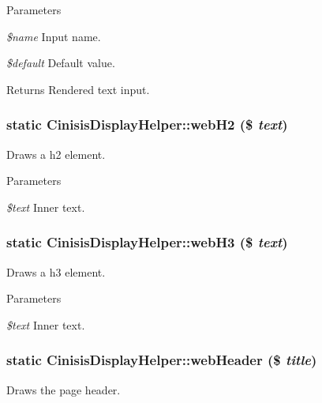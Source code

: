 \begin{DoxyParams}{Parameters}
\item[{\em \$name}]Input name.\item[{\em \$default}]Default value.\end{DoxyParams}
\begin{DoxyReturn}{Returns}
Rendered text input. 
\end{DoxyReturn}
\hypertarget{classCinisisDisplayHelper_a0f2e5c78f6fdd146df04382e497cfe94}{
\subsubsection[{webH2}]{\setlength{\rightskip}{0pt plus 5cm}static CinisisDisplayHelper::webH2 (\$ {\em text})}}
\label{classCinisisDisplayHelper_a0f2e5c78f6fdd146df04382e497cfe94}
Draws a h2 element.


\begin{DoxyParams}{Parameters}
\item[{\em \$text}]Inner text. \end{DoxyParams}
\hypertarget{classCinisisDisplayHelper_acc20c726a214895584d15a434b2f3548}{
\subsubsection[{webH3}]{\setlength{\rightskip}{0pt plus 5cm}static CinisisDisplayHelper::webH3 (\$ {\em text})}}
\label{classCinisisDisplayHelper_acc20c726a214895584d15a434b2f3548}
Draws a h3 element.


\begin{DoxyParams}{Parameters}
\item[{\em \$text}]Inner text. \end{DoxyParams}
\hypertarget{classCinisisDisplayHelper_a356d8117dfcb220b7bb9996b569f5f25}{
\subsubsection[{webHeader}]{\setlength{\rightskip}{0pt plus 5cm}static CinisisDisplayHelper::webHeader (\$ {\em title})}}
\label{classCinisisDisplayHelper_a356d8117dfcb220b7bb9996b569f5f25}
Draws the page header.


